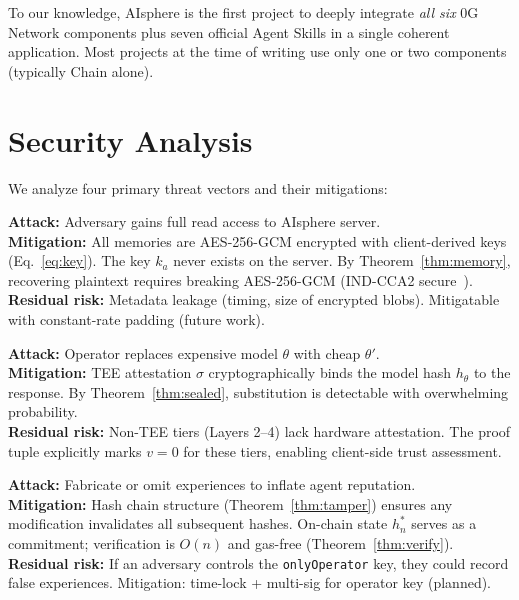 \documentclass[10pt,a4paper]{article}
\theoremstyle{definition}
\theoremstyle{plain}
\begin{document}
To our knowledge, AIsphere is the first project to deeply integrate \emph{all six} 0G Network components plus seven official Agent Skills in a single coherent application. Most projects at the time of writing use only one or two components (typically Chain alone).


\section{Security Analysis}
\label{sec:security}

We analyze four primary threat vectors and their mitigations:

\begin{threatbox}
\textbf{Attack:} Adversary gains full read access to AIsphere server.\\
\textbf{Mitigation:} All memories are AES-256-GCM encrypted with client-derived keys (Eq.~\ref{eq:key}). The key $k_a$ never exists on the server. By Theorem~\ref{thm:memory}, recovering plaintext requires breaking AES-256-GCM (IND-CCA2 secure~\cite{nist-gcm}).\\
\textbf{Residual risk:} Metadata leakage (timing, size of encrypted blobs). Mitigatable with constant-rate padding (future work).
\end{threatbox}

\begin{threatbox}
\textbf{Attack:} Operator replaces expensive model $\theta$ with cheap $\theta'$.\\
\textbf{Mitigation:} TEE attestation $\sigma$ cryptographically binds the model hash $h_\theta$ to the response. By Theorem~\ref{thm:sealed}, substitution is detectable with overwhelming probability.\\
\textbf{Residual risk:} Non-TEE tiers (Layers 2--4) lack hardware attestation. The proof tuple explicitly marks $v{=}0$ for these tiers, enabling client-side trust assessment.
\end{threatbox}

\begin{threatbox}
\textbf{Attack:} Fabricate or omit experiences to inflate agent reputation.\\
\textbf{Mitigation:} Hash chain structure (Theorem~\ref{thm:tamper}) ensures any modification invalidates all subsequent hashes. On-chain state $h_n^*$ serves as a commitment; verification is $O(n)$ and gas-free (Theorem~\ref{thm:verify}).\\
\textbf{Residual risk:} If an adversary controls the \texttt{onlyOperator} key, they could record false experiences. Mitigation: time-lock + multi-sig for operator key (planned).
\end{threatbox}
\end{document}
